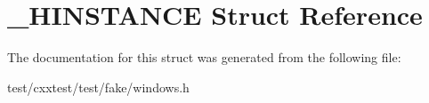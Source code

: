 \hypertarget{struct__HINSTANCE}{\section{\-\_\-\-H\-I\-N\-S\-T\-A\-N\-C\-E Struct Reference}
\label{struct__HINSTANCE}
}


The documentation for this struct was generated from the following file\-:\begin{DoxyCompactItemize}
\item 
test/cxxtest/test/fake/windows.\-h\end{DoxyCompactItemize}
